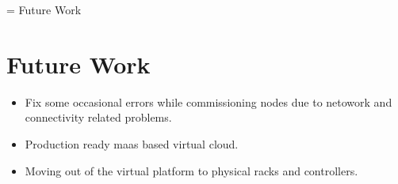 \chapname = {Future Work}

\chapter{Future Work}

\begin{itemize}
    \item Fix some occasional errors while commissioning nodes due to netowork and connectivity related problems.
    \item Production ready maas based virtual cloud.
    \item Moving out of the virtual platform to physical racks and controllers.
\end{itemize}